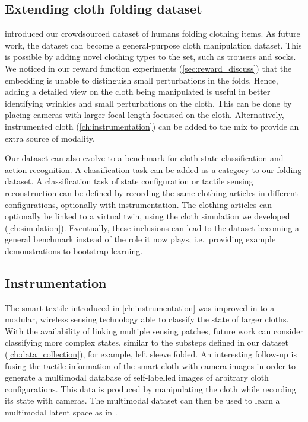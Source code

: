\documentclass[\home/main.tex]{subfiles}
\begin{document}
\subsection{Extending cloth folding dataset}
 introduced our crowdsourced dataset of humans folding clothing items. 
As future work, the dataset can become a general-purpose cloth manipulation dataset. This is possible by adding novel clothing types to the set, such as trousers and socks.
We noticed in our reward function experiments (\cref{sec:reward_discuss}) that the embedding is unable to distinguish small perturbations in the folds. Hence, adding a detailed view on the cloth being manipulated is useful in better identifying wrinkles and small perturbations on the cloth. This can be done by placing cameras with larger focal length focussed on the cloth. Alternatively, instrumented cloth (\cref{ch:instrumentation}) can be added to the mix to provide an extra source of modality.  

Our dataset can also evolve to a benchmark for cloth state classification and action recognition. 
A classification task can be added as a category to our folding dataset. A classification task of state configuration or tactile sensing reconstruction can be defined by recording the same clothing articles in different configurations, optionally with instrumentation. The clothing articles can optionally be linked to a virtual twin, using the cloth simulation we developed (\cref{ch:simulation}). 
Eventually, these inclusions can lead to the dataset becoming a general benchmark instead of the role it now plays, i.e.\ providing example demonstrations to bootstrap learning. 

\subsection{Instrumentation}
The smart textile introduced in \cref{ch:instrumentation} was improved in \autocite{Proesmans2022} to a modular, wireless sensing technology able to classify the state of larger cloths. With the availability of linking multiple sensing patches, future work can consider classifying more complex states, similar to the substeps defined in our dataset (\cref{ch:data_collection}), for example, left sleeve folded. An interesting follow-up is fusing the tactile information of the smart cloth with camera images in order to generate a multimodal database of self-labelled images of arbitrary cloth configurations. This data is produced by manipulating the cloth while recording its state with cameras. The multimodal dataset can then be used to learn a multimodal latent space as in \autocite{Lee2019}.
\end{document}
